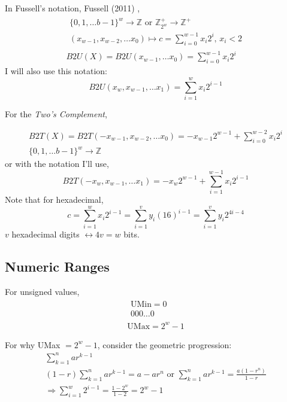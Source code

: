 \documentclass[10pt]{amsart}
\begin{document}
\begin{multicols*}{2}
In Fussell's notation, Fussell (2011) \cite{Fuss2011},
\[
\begin{gathered}
\begin{gathered}
\lbrace 0 ,1, \dots b-1 \rbrace^w \to \mathbb{Z} \text{ or } \mathbb{Z}^+_{2^w} \to \mathbb{Z}^+ \\
(x_{w-1}, x_{w-2}, \dots x_0) \mapsto c = \sum_{i=0}^{w-1} x_i 2^i, \, x_i < 2
\end{gathered} \\
B2U(X) = B2U(x_{w-1}, \dots x_0) = \sum_{i=0}^{w-1} x_i 2^i
\end{gathered}
\]
I will also use this notation:
\[
B2U(x_w, x_{w-1}, \dots x_1) = \sum_{i=1}^w x_i 2^{i-1}
\]

For the \emph{Two's Complement},

\[
\begin{gathered}
	B2T(X) = B2T(-x_{w-1}, x_{w-2}, \dots x_0) = -x_{w-1}2^{w-1} + \sum_{i=0}^{w-2} x_i 2^i \\
	\lbrace 0 , 1, \dots b-1 \rbrace^w \to \mathbb{Z} 
\end{gathered}
\]
or with the notation I'll use,
\[
B2T(-x_w, x_{w-1}, \dots x_1) = -x_w 2^{w-1} + \sum_{i=1}^{w-1} x_i 2^{i-1}
\]
Note that for hexadecimal,
\[
c = \sum_{i=1}^w x_i 2^{i-1} = \sum_{i=1}^v y_i (16)^{i-1} = \sum_{i=1}^v y_i 2^{4i-4}
\]
$v$ hexadecimal digits $\leftrightarrow  4v = w$ bits.

\subsection{Numeric Ranges}

For unsigned values, 
\[
\begin{gathered}
\begin{gathered} 
	\text{UMin} = 0 \\
	000 \dots 0 
\end{gathered} \\
\text{UMax} = 2^w - 1  
\end{gathered}
\]

For why UMax $=2^w -1$, consider the geometric progression:
\[
\begin{gathered}
	\sum_{k=1}^n ar^{k-1} \\
	(1-r) \sum_{k=1}^n ar^{k-1} = a-ar^n \text{ or } \sum_{k=1}^n ar^{k-1} = \frac{a(1-r^n) }{1-r} \\
	\Longrightarrow \sum_{i=1}^w 2^{i-1} = \frac{1-2^w}{1-2} = 2^w - 1
\end{gathered}
\]


\end{multicols*}
\end{document}
